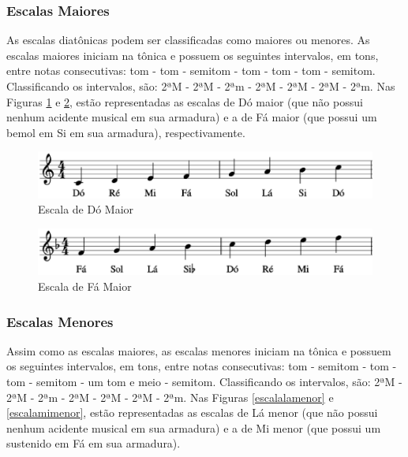       \subsubsection[Escalas Maiores]{Escalas Maiores}

        As escalas diatônicas podem ser classificadas como maiores ou menores. As escalas maiores iniciam na tônica e possuem os seguintes intervalos, em tons, entre notas consecutivas: tom - tom - semitom - tom - tom - tom - semitom. Classificando os intervalos, são: 2ªM - 2ªM - 2ªm - 2ªM - 2ªM - 2ªM - 2ªm. Nas Figuras \ref{escaladomaior} e \ref{escalafamaior}, estão representadas as escalas de Dó maior (que não possui nenhum acidente musical em sua armadura) e a de Fá maior (que possui um bemol em Si em sua armadura), respectivamente.

        \begin{figure}[htb]
          \centering
          \includegraphics[scale=0.6]{figuras/escaladomaior.eps}
          \caption{Escala de Dó Maior}
          \label{escaladomaior}
        \end{figure}

        \begin{figure}[htb]
          \centering
          \includegraphics[scale=0.6]{figuras/escalafamaior.eps}
          \caption{Escala de Fá Maior}
          \label{escalafamaior}
        \end{figure}

      \subsubsection[Escalas Menores]{Escalas Menores}

        Assim como as escalas maiores, as escalas menores iniciam na tônica e possuem os seguintes intervalos, em tons, entre notas consecutivas: tom - semitom - tom - tom - semitom - um tom e meio - semitom. Classificando os intervalos, são: 2ªM - 2ªM - 2ªm - 2ªM - 2ªM - 2ªM - 2ªm. Nas Figuras \ref{escalalamenor} e \ref{escalamimenor}, estão representadas as escalas de Lá menor (que não possui nenhum acidente musical em sua armadura) e a de Mi menor (que possui um sustenido em Fá em sua armadura).

